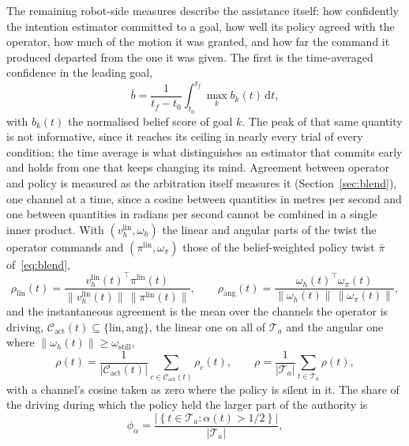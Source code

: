 \documentclass[12pt,a4paper,twoside,openright]{report}
\begin{document}
The remaining robot-side measures describe the assistance itself: how confidently the intention estimator committed to a goal, how well its policy agreed with the operator, how much of the motion it was granted, and how far the command it produced departed from the one it was given. The first is the time-averaged confidence in the leading goal,
\begin{equation}
\bar{b} = \frac{1}{t_f-t_0} \int_{t_0}^{t_f} \max_k b_k(t) \, \mathrm{d}t,
\label{eq:mb}
\end{equation}
with $b_k(t)$ the normalised belief score of goal $k$. The peak of that same quantity is not informative, since it reaches its ceiling in nearly every trial of every condition; the time average is what distinguishes an estimator that commits early and holds from one that keeps changing its mind. Agreement between operator and policy is measured as the arbitration itself measures it (Section~\ref{sec:blend}), one channel at a time, since a cosine between quantities in metres per second and one between quantities in radians per second cannot be combined in a single inner product. With $(v_h^{\mathrm{lin}}, \omega_h)$ the linear and angular parts of the twist the operator commands and $(\pi^{\mathrm{lin}}, \omega_\pi)$ those of the belief-weighted policy twist $\bar{\pi}$ of~\eqref{eq:blend},
\begin{equation}
\rho_{\mathrm{lin}}(t) = \frac{v_h^{\mathrm{lin}}(t)^{\top} \pi^{\mathrm{lin}}(t)}{\lVert v_h^{\mathrm{lin}}(t)\rVert \, \lVert \pi^{\mathrm{lin}}(t)\rVert}, \qquad
\rho_{\mathrm{ang}}(t) = \frac{\omega_h(t)^{\top} \omega_\pi(t)}{\lVert \omega_h(t)\rVert \, \lVert \omega_\pi(t)\rVert},
\label{eq:mrhoc}
\end{equation}
and the instantaneous agreement is the mean over the channels the operator is driving, $\mathcal{C}_{\mathrm{act}}(t) \subseteq \{\mathrm{lin}, \mathrm{ang}\}$, the linear one on all of $\mathcal{T}_a$ and the angular one where $\lVert \omega_h(t) \rVert \ge \omega_{\text{still}}$,
\begin{equation}
\rho(t) = \frac{1}{|\mathcal{C}_{\mathrm{act}}(t)|} \sum_{c \in \mathcal{C}_{\mathrm{act}}(t)} \rho_c(t), \qquad
\rho = \frac{1}{|\mathcal{T}_a|} \sum_{t \in \mathcal{T}_a} \rho(t),
\label{eq:mrho}
\end{equation}
with a channel's cosine taken as zero where the policy is silent in it. The share of the driving during which the policy held the larger part of the authority is
\begin{equation}
\phi_\alpha = \frac{\left|\left\{ t \in \mathcal{T}_a : \alpha(t) > 1/2 \right\}\right|}{\left|\mathcal{T}_a\right|},
\label{eq:mphi}
\end{equation}
\end{document}
